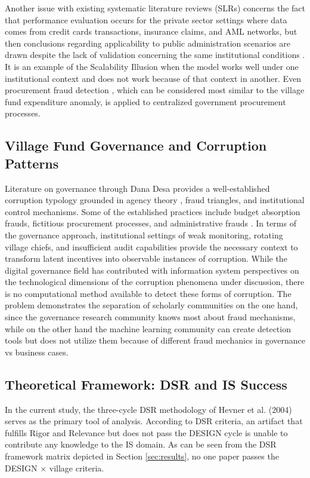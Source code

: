 \documentclass[3p,times,procedia]{elsarticle}
\begin{document}
Another issue with existing systematic literature reviews (SLRs) concerns the fact that performance evaluation occurs for the private sector settings where data comes from credit cards transactions, insurance claims, and AML networks, but then conclusions regarding applicability to public administration scenarios are drawn despite the lack of validation concerning the same institutional conditions \cite{p001,p022,p037}. It is an example of the Scalability Illusion when the model works well under one institutional context and does not work because of that context in another. Even procurement fraud detection \cite{p008,p043}, which can be considered most similar to the village fund expenditure anomaly, is applied to centralized government procurement processes.

\subsection{Village Fund Governance and Corruption Patterns}

Literature on governance through Dana Desa provides a well-established corruption typology grounded in agency theory \cite{method_jensen1976}, fraud triangles, and institutional control mechanisms. Some of the established practices include budget absorption frauds, fictitious procurement processes, and administrative frauds \cite{method_kpk2023}. In terms of the governance approach, institutional settings of weak monitoring, rotating village chiefs, and insufficient audit capabilities provide the necessary context to transform latent incentives into observable instances of corruption. While the digital governance field \cite{p013,p016,p039,p044} has contributed with information system perspectives on the technological dimensions of the corruption phenomena under discussion, there is no computational method available to detect these forms of corruption. The problem demonstrates the separation of scholarly communities on the one hand, since the governance research community knows most about fraud mechanisms, while on the other hand the machine learning community can create detection tools but does not utilize them because of different fraud mechanics in governance vs business cases.

\subsection{Theoretical Framework: DSR and IS Success}

In the current study, the three-cycle DSR methodology of Hevner et al. (2004) \cite{method_hevner2004} serves as the primary tool of analysis. According to DSR criteria, an artifact that fulfills Rigor and Relevance but does not pass the DESIGN cycle is unable to contribute any knowledge to the IS domain. As can be seen from the DSR framework matrix depicted in Section \ref{sec:results}, no one paper passes the DESIGN × village criteria.
\end{document}
